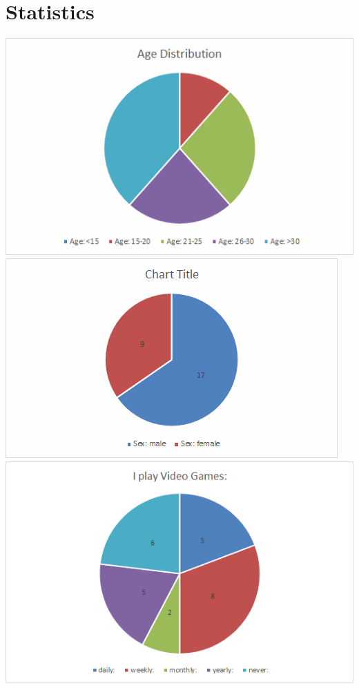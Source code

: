 \documentclass[11pt,a4paper,titlepage,table]{article}
\begin{document}
\section{Statistics}
\label{sec:stats}
\includegraphics[scale=0.5]{AgePie.png}
\includegraphics[scale=0.551]{SexPie.png}\\ 
\centering
\includegraphics[scale=0.6]{IPlayPie.png}
\end{document}
